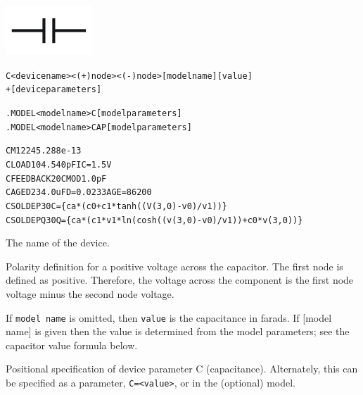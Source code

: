 


\begin{Device}

\symbol
{\includegraphics{capacitorSymbol}}

\device
\begin{alltt}
C<device name> <(+) node> <(-) node> [model name] [value]
+ [device parameters]
\end{alltt}

\model
\begin{alltt}
.MODEL <model name> C [model parameters]
.MODEL <model name> CAP [model parameters]
\end{alltt}

\examples
\begin{alltt}
CM12 2 4 5.288e-13
CLOAD 1 0 4.540pF IC=1.5V
CFEEDBACK 2 0 CMOD 1.0pF
CAGED 2 3 4.0uF D=0.0233 AGE=86200
CSOLDEP 3 0 C=\{ca*(c0+c1*tanh((V(3,0)-v0)/v1))\}
CSOLDEPQ 3 0 Q=\{ca*(c1*v1*ln(cosh((v(3,0)-v0)/v1))+c0*v(3,0))\}
\end{alltt}

\parameters
\begin{Parameters}
The name of the device.

Polarity definition for a positive voltage across the capacitor. The first
node is defined as positive. Therefore, the voltage across the component is
the first node voltage minus the second node voltage.

If \texttt{model name} is omitted, then \texttt{value} is the capacitance in
farads.  If [model name] is given then the value is determined from the model
parameters; see the capacitor value formula below.

Positional specification of device parameter C (capacitance).  Alternately,
this can be specified as a parameter, \texttt{C=<value>}, or in the (optional)
model.


\end{Parameters}
\end{Device}
